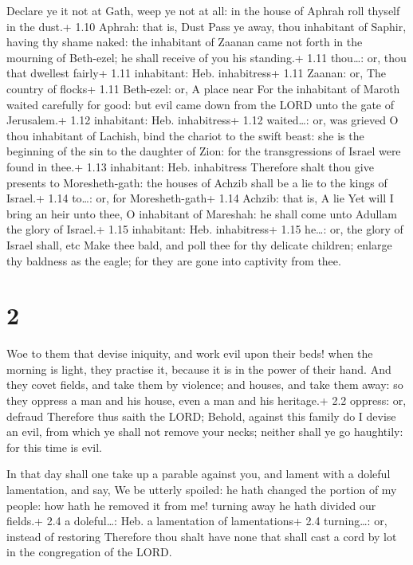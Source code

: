  Declare ye it not at Gath, weep ye not at all: in the
house of Aphrah roll thyself in the dust.+ 1.10 Aphrah: that is, Dust
 Pass ye away, thou inhabitant of Saphir, having thy shame
naked: the inhabitant of Zaanan came not forth in the mourning of
Beth-ezel; he shall receive of you his standing.+ 1.11 thou\ldots: or,
thou that dwellest fairly+ 1.11 inhabitant: Heb. inhabitress+ 1.11
Zaanan: or, The country of flocks+ 1.11 Beth-ezel: or, A place near
 For the inhabitant of Maroth waited carefully for good:
but evil came down from the LORD unto the gate of Jerusalem.+ 1.12
inhabitant: Heb. inhabitress+ 1.12 waited\ldots: or, was grieved
 O thou inhabitant of Lachish, bind the chariot to the
swift beast: she is the beginning of the sin to the daughter of Zion:
for the transgressions of Israel were found in thee.+ 1.13 inhabitant:
Heb. inhabitress  Therefore shalt thou give presents to
Moresheth-gath: the houses of Achzib shall be a lie to the kings of
Israel.+ 1.14 to\ldots: or, for Moresheth-gath+ 1.14 Achzib: that is, A
lie  Yet will I bring an heir unto thee, O inhabitant of
Mareshah: he shall come unto Adullam the glory of Israel.+ 1.15
inhabitant: Heb. inhabitress+ 1.15 he\ldots: or, the glory of Israel
shall, etc  Make thee bald, and poll thee for thy delicate
children; enlarge thy baldness as the eagle; for they are gone into
captivity from thee.

\hypertarget{section-1}{%
\section{2}\label{section-1}}

 Woe to them that devise iniquity, and work evil upon their
beds! when the morning is light, they practise it, because it is in the
power of their hand.  And they covet fields, and take them
by violence; and houses, and take them away: so they oppress a man and
his house, even a man and his heritage.+ 2.2 oppress: or, defraud
 Therefore thus saith the LORD; Behold, against this family
do I devise an evil, from which ye shall not remove your necks; neither
shall ye go haughtily: for this time is evil.

 In that day shall one take up a parable against you, and
lament with a doleful lamentation, and say, We be utterly spoiled: he
hath changed the portion of my people: how hath he removed it from me!
turning away he hath divided our fields.+ 2.4 a doleful\ldots: Heb. a
lamentation of lamentations+ 2.4 turning\ldots: or, instead of restoring
 Therefore thou shalt have none that shall cast a cord by
lot in the congregation of the LORD.

